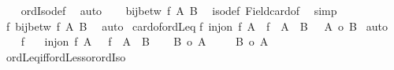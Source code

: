\begin{isabellebody}
\ \ \isamarkupfalse%
\ ordIso{\isacharunderscore}{\kern0pt}def\ \isamarkupfalse%
\ auto\isanewline
\ \ \isamarkupfalse%
\ {\isachardoublequoteopen}bij{\isacharunderscore}{\kern0pt}betw\ f\ A\ B{\isachardoublequoteclose}\ \isamarkupfalse%
\ iso{\isacharunderscore}{\kern0pt}def\ Field{\isacharunderscore}{\kern0pt}card{\isacharunderscore}{\kern0pt}of\ \isamarkupfalse%
\ simp\isanewline
\ \ \isamarkupfalse%
\ {\isachardoublequoteopen}{\isasymexists}f{\isachardot}{\kern0pt}\ bij{\isacharunderscore}{\kern0pt}betw\ f\ A\ B{\isachardoublequoteclose}\ \isamarkupfalse%
\ auto\isanewline
{}\isamarkupfalse%
%
\endisatagproof
{\isafoldproof}%
%
\isadelimproof
\isanewline
%
\endisadelimproof
\isanewline
{}\isamarkupfalse%
\ card{\isacharunderscore}{\kern0pt}of{\isacharunderscore}{\kern0pt}ordLeq{\isacharcolon}{\kern0pt}\isanewline
{\isachardoublequoteopen}{\isacharparenleft}{\kern0pt}{\isasymexists}f{\isachardot}{\kern0pt}\ inj{\isacharunderscore}{\kern0pt}on\ f\ A\ {\isasymand}\ f\ {\isacharbackquote}{\kern0pt}\ A\ {\isasymle}\ B{\isacharparenright}{\kern0pt}\ {\isacharequal}{\kern0pt}\ {\isacharparenleft}{\kern0pt}\ {\isacharbar}{\kern0pt}A{\isacharbar}{\kern0pt}\ {\isasymle}o\ {\isacharbar}{\kern0pt}B{\isacharbar}{\kern0pt}\ {\isacharparenright}{\kern0pt}{\isachardoublequoteclose}\isanewline
%
\isadelimproof
%
\endisadelimproof
%
\isatagproof
{}\isamarkupfalse%
{\isacharparenleft}{\kern0pt}auto{\isacharparenright}{\kern0pt}\isanewline
\ \ \isamarkupfalse%
\ f\ \isamarkupfalse%
\ {\isacharasterisk}{\kern0pt}{\isacharcolon}{\kern0pt}\ {\isachardoublequoteopen}inj{\isacharunderscore}{\kern0pt}on\ f\ A{\isachardoublequoteclose}\ \ {\isacharasterisk}{\kern0pt}{\isacharasterisk}{\kern0pt}{\isacharcolon}{\kern0pt}\ {\isachardoublequoteopen}f\ {\isacharbackquote}{\kern0pt}\ A\ {\isasymle}\ B{\isachardoublequoteclose}\isanewline
\ \ \isacommand{{\isacharbraceleft}{\kern0pt}}\isamarkupfalse%
\isamarkupfalse%
\ {\isachardoublequoteopen}{\isacharbar}{\kern0pt}B{\isacharbar}{\kern0pt}\ {\isacharless}{\kern0pt}o\ {\isacharbar}{\kern0pt}A{\isacharbar}{\kern0pt}{\isachardoublequoteclose}\isanewline
\ \ \ \isamarkupfalse%
\ {\isachardoublequoteopen}{\isacharbar}{\kern0pt}B{\isacharbar}{\kern0pt}\ {\isasymle}o\ {\isacharbar}{\kern0pt}A{\isacharbar}{\kern0pt}{\isachardoublequoteclose}\ \isamarkupfalse%
\ ordLeq{\isacharunderscore}{\kern0pt}iff{\isacharunderscore}{\kern0pt}ordLess{\isacharunderscore}{\kern0pt}or{\isacharunderscore}{\kern0pt}ordIso\ \isamarkupfalse%

\end{isabellebody}
